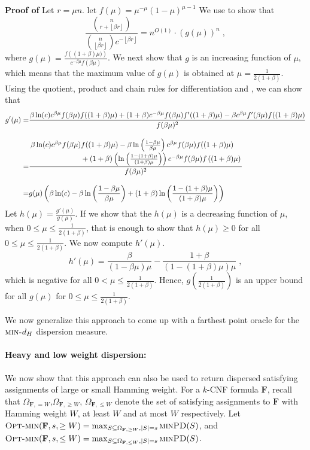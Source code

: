 \documentclass[11pt, letterpaper]{article}
\theoremstyle{definition}
\newcommand{\f}{\mathbf{F}}
\newcommand{\PD}{\textsc{minPD}}
\newcommand{\mind}{\textsc{min-}d_H}
\newcommand{\optm}{\textsc{Opt-min}}
\newcommand{\floor}[1]{{\left\lfloor{#1}\right\rfloor}}
\begin{document}
\noindent \textbf{Proof of }
    Let $r= \mu n$. let $f(\mu)=\mu^{-\mu} (1-\mu)^{\mu-1}$ We use  to show that 
    \[\frac{\binom{n}{r+\floor{\beta r}}}{\binom{n}{\floor{\beta r}} c^{-\floor{\beta r}}} = n^{O(1)} \cdot \left(g(\mu)\right)^n \; , \]
    where $g(\mu)=\frac{f\left((1+\beta) \mu)\right)}{c^{-\beta \mu} f\left(\beta \mu\right)}$. We next show that $g$ is an increasing function of $\mu$, which means that the maximum value of $g(\mu)$ is obtained at $\mu=\frac{1}{2(1+\beta)}$. Using the quotient, product and chain rules for differentiation and , we can show that
    \begin{align*}
        g'(\mu)=& \frac{\beta \ln(c) c^{\beta \mu} f(\beta \mu) f((1+\beta) \mu) + (1+\beta) c^{- \beta \mu } f(\beta \mu) f'((1+\beta) \mu)-\beta c^{\beta \mu} f'(\beta \mu) f((1+\beta) \mu)}{f(\beta \mu)^2} \\
        \noalign{\vskip9pt}
        =& \frac{ \splitfrac{\beta \ln(c) c^{\beta \mu} f(\beta \mu) f((1+\beta) \mu) - \beta \ln\left(\frac{1-\beta \mu}{\beta \mu}\right)c^{\beta \mu } f(\beta \mu)f((1+\beta) \mu)}{
        +(1+\beta) \left( \ln \left(\frac{1-(1+\beta)\mu}{(1+\beta)\mu}\right) \right)c^{-\beta \mu} f(\beta \mu) f\left( (1+\beta) \mu \right)} }{f(\beta\mu)^2}\\
        \noalign{\vskip9pt}
        =& g(\mu) \left(\beta \ln(c) - \beta \ln\left(\frac{1-\beta \mu}{\beta \mu}\right) +(1+\beta) \ln \left(\frac{1-(1+\beta)\mu}{(1+\beta)\mu}\right)\right)
    \end{align*}
    Let $h(\mu)=\frac{g'(\mu)}{g(\mu)}$. If we show that the $h(\mu)$ is a decreasing function of $\mu$, when $0 \leq \mu \leq \frac{1}{2(1+\beta)}$, that is enough to show that $h(\mu)\geq 0$ for all $0 \leq \mu \leq \frac{1}{2(1+\beta)}$. We now compute $h'(\mu)$.
    \begin{equation*}
        h'(\mu)= \frac{\beta}{(1-\beta \mu) \mu} - \frac{1+\beta}{(1-(1+\beta)\mu)\mu} \; ,
    \end{equation*}
    which is negative for all $0 < \mu \leq \frac{1}{2(1+\beta)}$. Hence, $g\left(\frac{1}{2(1+\beta)}\right)$ is an upper bound for all $g(\mu)$ for $0 \leq \mu \leq \frac{1}{2(1+\beta)}$.
    
We now generalize this approach to come up with a farthest point oracle for the $\mind$ dispersion measure.
 
\paragraph{Heavy and low weight dispersion:} We now show that this approach can also be used to return dispersed satisfying assignments of large or small Hamming weight. For a $k$-CNF formula $\f$, recall that $\Omega_{\f,= W}$,$\Omega_{\f,\geq W}$, $\Omega_{\f,\leq W}$ denote the set of satisfying assignments to $\f$ with Hamming weight $W$, at least $W$ and at most $W$ respectively. Let $\optm(\f,s,\geq W)=\max_{S \subseteq \Omega_{\f,\geq W}, |S|=s} \PD(S)$, and $\optm(\f,s,\leq W)=\max_{S \subseteq \Omega_{\f,\leq W}, |S|=s} \PD(S)$. 
\end{document}
